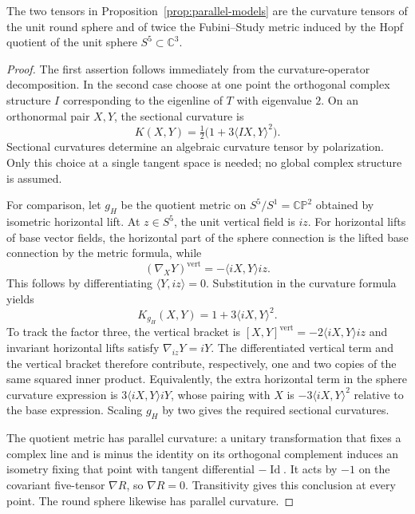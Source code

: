 \begin{lemma}\label{lem:model-curvature}
The two tensors in Proposition~\ref{prop:parallel-models} are the curvature tensors of the unit round sphere and of twice the Fubini--Study metric induced by the Hopf quotient of the unit sphere $S^5\subset\mathbb C^3$.
\end{lemma}
\begin{proof}
The first assertion follows immediately from the curvature-operator decomposition. In the second case choose at one point the orthogonal complex structure $I$ corresponding to the eigenline of $T$ with eigenvalue $2$. On an orthonormal pair $X,Y$, the sectional curvature is
\[
 K(X,Y)=\tfrac12\bigl(1+3\langle IX,Y\rangle^2\bigr).
\]
Sectional curvatures determine an algebraic curvature tensor by polarization. Only this choice at a single tangent space is needed; no global complex structure is assumed.

For comparison, let $g_H$ be the quotient metric on $S^5/S^1=\mathbb{CP}^2$ obtained by isometric horizontal lift. At $z\in S^5$, the unit vertical field is $iz$. For horizontal lifts of base vector fields, the horizontal part of the sphere connection is the lifted base connection by the metric formula, while
\[
 (\nabla_XY)^{\mathrm{vert}}=-\langle iX,Y\rangle iz.
\]
This follows by differentiating $\langle Y,iz\rangle=0$. Substitution in the curvature formula yields
\[
 K_{g_H}(X,Y)=1+3\langle iX,Y\rangle^2.
\]
To track the factor three, the vertical bracket is
$[X,Y]^{\mathrm{vert}}=-2\langle iX,Y\rangle iz$ and invariant horizontal lifts satisfy $\nabla_{iz}Y=iY$. The differentiated vertical term and the vertical bracket therefore contribute, respectively, one and two copies of the same squared inner product. Equivalently, the extra horizontal term in the sphere curvature expression is $3\langle iX,Y\rangle iY$, whose pairing with $X$ is $-3\langle iX,Y\rangle^2$ relative to the base expression. Scaling $g_H$ by two gives the required sectional curvatures.

The quotient metric has parallel curvature: a unitary transformation that fixes a complex line and is minus the identity on its orthogonal complement induces an isometry fixing that point with tangent differential $-\operatorname{Id}$. It acts by $-1$ on the covariant five-tensor $\nabla R$, so $\nabla R=0$. Transitivity gives this conclusion at every point. The round sphere likewise has parallel curvature.
\end{proof}

